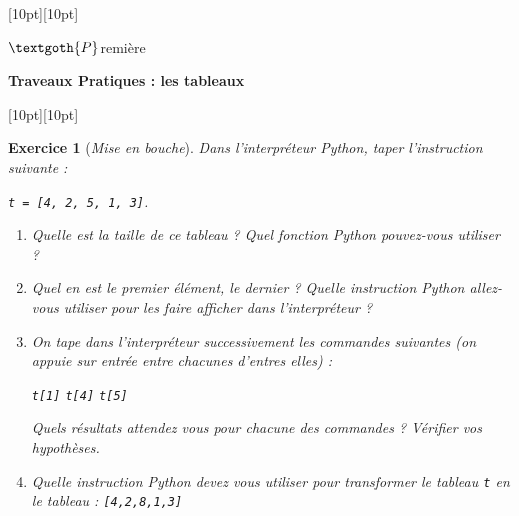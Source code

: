 \documentclass[12pt]{article}                   %
\newcounter{exoscount}
\theoremstyle{exercicestyle}
\newtheorem{exos}[exoscount]{Exercice}
\newenvironment{exo}[2]
  {
   \begin{exos}[#1]
   \leavevmode
   \marginpar{\hfill $#2 $ }}
  {\end{exos}}
\theoremstyle{break2}
\theoremstyle{break3}
\begin{document}
\noindent\hrulefill
\raisebox{-2.1pt}[10pt][10pt]{\quad\decoone\quad}\hrulefill 

\hfill $\textgoth{P}$remière
 \begin{center}{\quad \large{\textbf{ Traveaux Pratiques : les tableaux }}\; }\end{center}
\vspace{0.5cm}
\noindent
\hrulefill
\raisebox{-16.4pt}[10pt][10pt]{}\hrulefill
\vspace{1cm}

\begin{exo}{\textit{Mise en bouche}}{  }
    Dans l'interpréteur Python, taper l'instruction suivante :
    \begin{center}
        \texttt{t = [4, 2, 5, 1, 3]}.
    \end{center}
    \begin{enumerate}
        \item Quelle est la taille de ce tableau ? Quel fonction Python pouvez-vous utiliser ?
        \item Quel en est le premier élément, le dernier ? Quelle instruction Python allez-vous utiliser pour les faire afficher dans l'interpréteur ?
        \item On tape dans l'interpréteur successivement les commandes suivantes (on appuie sur entrée entre chacunes d'entres elles) :
            \begin{center}
                \texttt{t[1]} \hspace{1cm} \texttt{t[4]} \hspace{1cm} \texttt{t[5]}
            \end{center}
            Quels résultats attendez vous pour chacune des commandes ? Vérifier vos hypothèses.
        \item Quelle instruction Python devez vous utiliser pour transformer le tableau \texttt{t} en le tableau : \texttt{[4,2,8,1,3]}
    \end{enumerate}
\end{exo} 
\end{document}
